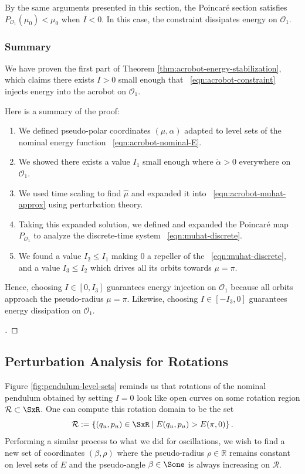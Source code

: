 By the same arguments presented in this section, the Poincar\'{e} section
satisfies \( P_{\mathcal{O}_1}(\mu_0) < \mu_0 \) when \(I < 0\). 
In this case, the constraint dissipates energy on \(\mathcal{O}_1\).

\subsubsection*{Summary}

We have proven the first part of Theorem \ref{thm:acrobot-energy-stabilization},
which claims there exists \(I > 0\) small enough that 
~\eqref{eqn:acrobot-constraint} injects energy into the acrobot on
\(\mathcal{O}_1\).

Here is a summary of the proof:
\begin{enumerate}
    \item We defined pseudo-polar coordinates \((\mu,\alpha)\) adapted to level
        sets of the nominal energy function ~\eqref{eqn:acrobot-nominal-E}.
    \item We showed there exists a value \(I_1\) small enough where 
        \(\dot{\alpha} > 0\) everywhere on \(\mathcal{O}_1\).
    \item We used time scaling to find \(\hat{\mu}\) and
        expanded it into ~\eqref{eqn:acrobot-muhat-approx} using
        perturbation theory.
    \item Taking this expanded solution, we defined and expanded the
        Poincar\'{e} map \(P_{\mathcal{O}_1}\) to analyze the discrete-time system
        ~\eqref{eqn:muhat-discrete}.
    \item We found a value \(I_2 \leq I_1\) making 0 a repeller of the
        ~\eqref{eqn:muhat-discrete}, and a value \(I_3 \leq I_2\) which drives
        all its orbits towards \(\mu = \pi\).
\end{enumerate}
Hence, choosing \(I \in [0,I_3]\) guarantees energy injection on
\(\mathcal{O}_1\) because all orbits approach the pseudo-radius \(\mu = \pi\).
Likewise, choosing \(I \in [-I_3,0]\) guarantees energy dissipation on
\(\mathcal{O}_1\).

\begin{proof}[\unskip\nopunct]
\end{proof}

\subsection{Perturbation Analysis for Rotations}
Figure \ref{fig:pendulum-level-sets} reminds us that rotations of the 
nominal pendulum obtained by setting \(I = 0\) look like open curves on some
rotation region \(\mathcal{R} \subset \SxR\).
One can compute this rotation domain to be the set
\[
    \mathcal{R} := \left\{ (q_u,p_u) \in \SxR \mid E(q_u,p_u) > E(\pi,0)\right\}
    .
\]
Performing a similar process to what we did for oscillations,
we wish to find a new set of coordinates \((\beta,\rho)\)
where the pseudo-radius \(\rho \in \mathbb{R}\) remains constant on level sets
of \(E\) and the pseudo-angle \(\beta \in \Sone\) is always increasing on
\(\mathcal{R}\).

